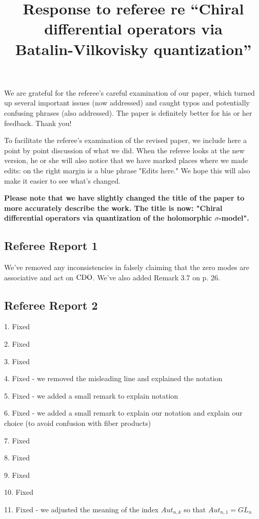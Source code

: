 \documentclass[10pt]{amsart}
\title{Response to referee re ``Chiral differential operators via\\Batalin-Vilkovisky quantization''}
\begin{document}
\maketitle

We are grateful for the referee's careful examination of our paper, 
which turned up several important issues (now addressed) and caught typos and potentially confusing phrases (also addressed).
The paper is definitely better for his or her feedback.
Thank you!

To facilitate the referee's examination of the revised paper, 
we include here a point by point discussion of what we did.
When the referee looks at the new version, 
he or she will also notice that we have marked places where we made edits:
on the right margin is a blue phrase "Edits here."
We hope this will also make it easier to see what's changed.

{\bf Please note that we have slightly changed the title of the paper to more accurately describe the work.
The title is now:  "Chiral differential operators via quantization of the holomorphic $\sigma$-model".}

\subsection*{Referee Report 1}

We've removed any inconsistencies in falsely claiming that the zero modes are associative and act on ${\rm CDO}$. We've also added Remark 3.7 on p. 26. 

\subsection*{Referee Report 2}

1. Fixed

2. Fixed

3. Fixed

4. Fixed - we removed the misleading line and explained the notation

5. Fixed - we added a small remark to explain notation

6. Fixed - we added a small remark to explain our notation and explain our choice (to avoid confusion with fiber products)

7. Fixed

8. Fixed

9. Fixed

10. Fixed

11. Fixed - we adjusted the meaning of the index $Aut_{n,k}$ so that $Aut_{n,1} = GL_n$
\end{document}
